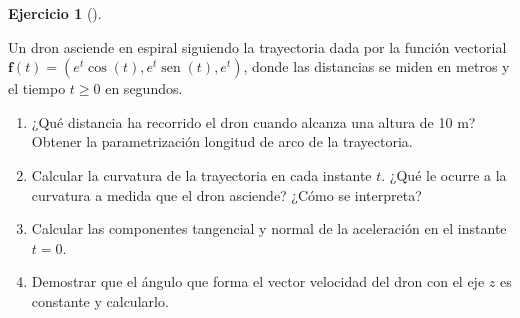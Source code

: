 \documentclass[
  spanish,
  a4paper,
]{scrreport}
\theoremstyle{definition}
\newtheorem{exercise}{Ejercicio}[chapter]
\theoremstyle{remark}
\begin{document}
\begin{exercise}[]\protect\hypertarget{exr-1}{}\label{exr-1}

Un dron asciende en espiral siguiendo la trayectoria dada por la función
vectorial
\(\mathbf{f}(t) = \left(e^t\cos(t), e^t\operatorname{sen}(t), e^t\right)\),
donde las distancias se miden en metros y el tiempo \(t\geq 0\) en
segundos.

\begin{enumerate}
\def\labelenumi{\alph{enumi}.}
\item
  ¿Qué distancia ha recorrido el dron cuando alcanza una altura de 10 m?
  Obtener la parametrización longitud de arco de la trayectoria.
\item
  Calcular la curvatura de la trayectoria en cada instante \(t\). ¿Qué
  le ocurre a la curvatura a medida que el dron asciende? ¿Cómo se
  interpreta?
\item
  Calcular las componentes tangencial y normal de la aceleración en el
  instante \(t=0\).
\item
  Demostrar que el ángulo que forma el vector velocidad del dron con el
  eje \(z\) es constante y calcularlo.
\end{enumerate}

\end{exercise}
\end{document}
